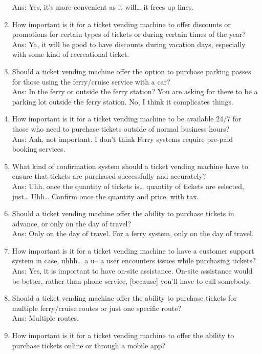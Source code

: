 \begin{enumerate}
Ans: Yes, it’s more convenient as it will… it frees up lines.
    \item How important is it for a ticket vending machine to offer discounts or promotions for certain types of tickets or during certain times of the year?\\
Ans: Ya, it will be good to have discounts during vacation days, especially with some kind of recreational ticket.
    \item Should a ticket vending machine offer the option to purchase parking passes for those using the ferry/cruise service with a car?\\
Ans: In the ferry or outside the ferry station? You are asking for there to be a parking lot outside the ferry station. No, I think it complicates things.
    \item How important is it for a ticket vending machine to be available 24/7 for those who need to purchase tickets outside of normal business hours?\\
Ans: Aah, not important. I don’t think Ferry systems require pre-paid booking services.
    \item What kind of confirmation system should a ticket vending machine have to ensure that tickets are purchased successfully and accurately?\\
Ans: Uhh, once the quantity of tickets is… quantity of tickets are selected, just… Uhh… Confirm once the quantity and price, with tax.
    \item Should a ticket vending machine offer the ability to purchase tickets in advance, or only on the day of travel?\\
Ans: Only on the day of travel. For a ferry system, only on the day of travel.
    \item How important is it for a ticket vending machine to have a customer support system in case, uhhh… a u-- a user encounters issues while purchasing tickets?\\
Ans: Yes, it is important to have on-site assistance. On-site assistance would be better, rather than phone service, [because] you’ll have to call somebody.
    \item Should a ticket vending machine offer the ability to purchase tickets for multiple ferry/cruise routes or just one specific route?\\
Ans: Multiple routes.
    \item How important is it for a ticket vending machine to offer the ability to purchase tickets online or through a mobile app?\\

\end{enumerate}
